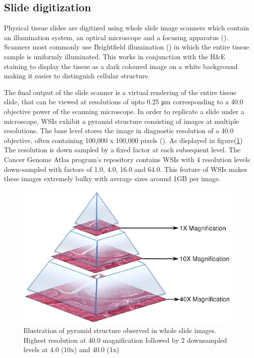 \documentclass{l4proj}
\begin{document}
\subsection{Slide digitization}
Physical tissue slides are digitized using whole slide image scanners which contain an illumination system, an optical microscope and a focusing apparatus (\textit{\cite{ghaznavi2013digital}}). Scanners most commonly use Brightfield illumination (\textit{\cite{kino1996confocal}}) in which the entire tissue sample is uniformly illuminated. This works in conjunction with the H\&E staining to display the tissue as a dark coloured image on a white background making it easier to distinguish cellular structure. 

The final output of the slide scanner is a virtual rendering of the entire tissue slide, that can be viewed at resolutions of upto 0.25 \si{\micro\meter} corresponding to a 40.0 objective power of the scanning microscope. In order to replicate a slide under a microscope, WSIs exhibit a pyramid structure consisting of images at multiple resolutions. The base level stores the image in diagnostic resolution of a 40.0 objective, often containing 100,000 x 100,000 pixels (\textit{\cite{wang2012managing}}). As displayed in figure(\ref{fig:pyramid-fig}) The resolution is down sampled by a fixed factor at each subsequent level. The Cancer Genome Atlas program's repository contains WSIs with 4 resolution levels down-sampled with factors of 1.0, 4.0, 16.0 and 64.0. This feature of WSIs makes these images extremely bulky with average sizes around 1GB per image. 

\begin{figure}[h]
\centering
\includegraphics[scale=0.5]{images/digital-slide-stored-in-a-pyramid-structure.png}
\caption{Illustration of pyramid structure observed in whole slide images. Highest resolution at 40.0 magnification followed by 2 downsampled levels at 4.0 (10x) and 40.0 (1x)}
\label{fig:pyramid-fig}
\end{figure}
\end{document}
